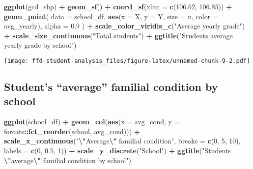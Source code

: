 \documentclass[
]{article}
\newenvironment{Shaded}{\begin{snugshade}}{\end{snugshade}}
\newcommand{\AttributeTok}[1]{\textcolor[rgb]{0.13,0.29,0.53}{#1}}
\newcommand{\DecValTok}[1]{\textcolor[rgb]{0.00,0.00,0.81}{#1}}
\newcommand{\FloatTok}[1]{\textcolor[rgb]{0.00,0.00,0.81}{#1}}
\newcommand{\FunctionTok}[1]{\textcolor[rgb]{0.13,0.29,0.53}{\textbf{#1}}}
\newcommand{\NormalTok}[1]{#1}
\newcommand{\SpecialCharTok}[1]{\textcolor[rgb]{0.81,0.36,0.00}{\textbf{#1}}}
\newcommand{\StringTok}[1]{\textcolor[rgb]{0.31,0.60,0.02}{#1}}
\begin{document}
\begin{Shaded}
\begin{Highlighting}[]
\FunctionTok{ggplot}\NormalTok{(gcd\_shp) }\SpecialCharTok{+}
  \FunctionTok{geom\_sf}\NormalTok{() }\SpecialCharTok{+}
  \FunctionTok{coord\_sf}\NormalTok{(}\AttributeTok{xlim =} \FunctionTok{c}\NormalTok{(}\FloatTok{106.62}\NormalTok{, }\FloatTok{106.85}\NormalTok{)) }\SpecialCharTok{+}
  \FunctionTok{geom\_point}\NormalTok{(}
    \AttributeTok{data =}\NormalTok{ school\_df,}
    \FunctionTok{aes}\NormalTok{(}\AttributeTok{x =}\NormalTok{ X, }\AttributeTok{y =}\NormalTok{ Y, }\AttributeTok{size =}\NormalTok{ n, }\AttributeTok{color =}\NormalTok{ avg\_yearly),}
    \AttributeTok{alpha =} \FloatTok{0.9}
\NormalTok{  ) }\SpecialCharTok{+}
  \FunctionTok{scale\_color\_viridis\_c}\NormalTok{(}\StringTok{"Average yearly grade"}\NormalTok{) }\SpecialCharTok{+} 
  \FunctionTok{scale\_size\_continuous}\NormalTok{(}\StringTok{"Total students"}\NormalTok{) }\SpecialCharTok{+} 
  \FunctionTok{ggtitle}\NormalTok{(}\StringTok{"Student\textquotesingle{}s average yearly grade by school"}\NormalTok{)}
\end{Highlighting}
\end{Shaded}

\texttt{[image: ffd-student-analysis\_files/figure-latex/unnamed-chunk-9-2.pdf]}

\hypertarget{students-average-familial-condition-by-school}{%
\subsection{Student's ``average'' familial condition by
school}\label{students-average-familial-condition-by-school}}

\begin{Shaded}
\begin{Highlighting}[]
\FunctionTok{ggplot}\NormalTok{(school\_df) }\SpecialCharTok{+} 
  \FunctionTok{geom\_col}\NormalTok{(}\FunctionTok{aes}\NormalTok{(}\AttributeTok{x =}\NormalTok{ avg\_cond, }\AttributeTok{y =}\NormalTok{ forcats}\SpecialCharTok{::}\FunctionTok{fct\_reorder}\NormalTok{(school, avg\_cond))) }\SpecialCharTok{+}
  \FunctionTok{scale\_x\_continuous}\NormalTok{(}\StringTok{"}\SpecialCharTok{\textbackslash{}"}\StringTok{Average}\SpecialCharTok{\textbackslash{}"}\StringTok{ familial condition"}\NormalTok{, }\AttributeTok{breaks =} \FunctionTok{c}\NormalTok{(}\DecValTok{0}\NormalTok{, }\DecValTok{5}\NormalTok{, }\DecValTok{10}\NormalTok{), }\AttributeTok{labels =} \FunctionTok{c}\NormalTok{(}\DecValTok{0}\NormalTok{, }\FloatTok{0.5}\NormalTok{, }\DecValTok{1}\NormalTok{)) }\SpecialCharTok{+}
  \FunctionTok{scale\_y\_discrete}\NormalTok{(}\StringTok{"School"}\NormalTok{) }\SpecialCharTok{+}
  \FunctionTok{ggtitle}\NormalTok{(}\StringTok{"Student\textquotesingle{}s }\SpecialCharTok{\textbackslash{}"}\StringTok{average}\SpecialCharTok{\textbackslash{}"}\StringTok{ familial condition by school"}\NormalTok{)}
\end{Highlighting}
\end{Shaded}
\end{document}
